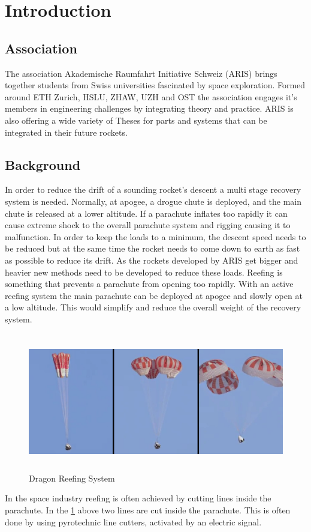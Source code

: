 \section{Introduction}
\label{sec:intro}

\subsection{Association}
The association Akademische Raumfahrt Initiative Schweiz (ARIS) brings together students from Swiss universities fascinated by space exploration. Formed around ETH Zurich, HSLU, ZHAW, UZH and OST the association engages it's members in engineering challenges by integrating theory and practice. ARIS is also offering a wide variety of Theses for parts and systems that can be integrated in their future rockets. 

\subsection{Background}
In order to reduce the drift of a sounding rocket's descent a multi stage recovery system is needed. Normally, at apogee, a drogue chute is deployed, and the main chute is released at a lower altitude. If a parachute inflates too rapidly it can cause extreme shock to the overall parachute system and rigging causing it to malfunction. In order to keep the loads to a minimum, the descent speed needs to be reduced but at the same time the rocket needs to come down to earth as fast as possible to reduce its drift. As the rockets developed by ARIS get bigger and heavier new methods need to be developed to reduce these loads.\newline
Reefing is something that prevents a parachute from opening too rapidly. With an active reefing system the main parachute can be deployed at apogee and slowly open at a low altitude. This would simplify and reduce the overall weight of the recovery system.
\medskip
\begin{figure}[h!]
	\centering
	\includegraphics[height=6cm]{images/dragon.jpg}
	\caption{Dragon Reefing System}
	\label{fig:dragon_parachute}
\end{figure}

In the space industry reefing is often achieved by cutting lines inside the parachute. In the \cref{fig:dragon_parachute} above two lines are cut inside the parachute. This is often done by using pyrotechnic line cutters, activated by an electric signal.